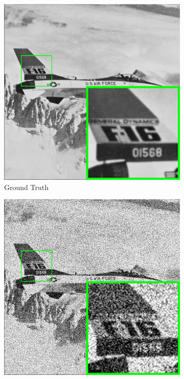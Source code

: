 \begin{figure}
    \centering
    \begin{subfigure}[t]{0.24\textwidth}
        \centering
        \includegraphics[width=1\textwidth]{images/pgpd/br_airplane.png}
	   \caption{Ground Truth}
    \end{subfigure}
    \hfill
    \begin{subfigure}[t]{0.24\textwidth}
        \centering
        \includegraphics[width=1\textwidth]{images/pgpd/br_airplane_50.png}

\end{subfigure}
\end{figure}

